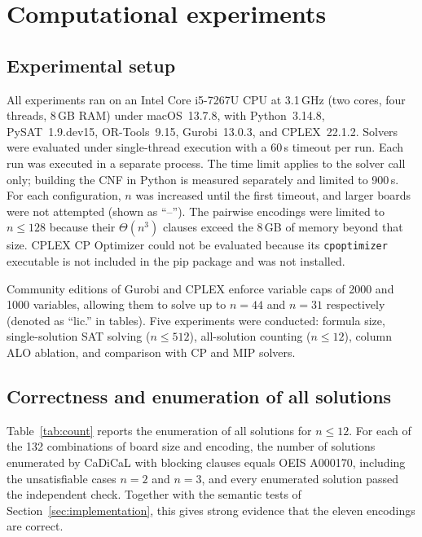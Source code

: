 \documentclass[a4paper,fleqn]{cas-sc}
\begin{document}
\FloatBarrier
\section{Computational experiments}\label{sec:experiments}

\subsection{Experimental setup}

All experiments ran on an Intel Core i5-7267U CPU at 3.1\,GHz (two cores, four threads, 8\,GB RAM) under macOS~13.7.8, with Python~3.14.8, PySAT~1.9.dev15, OR-Tools~9.15, Gurobi~13.0.3, and CPLEX~22.1.2. Solvers were evaluated under single-thread execution with a 60\,s timeout per run. Each run was executed in a separate process. The time limit applies to the solver call only; building the CNF in Python is measured separately and limited to 900\,s. For each configuration, $n$ was increased until the first timeout, and larger boards were not attempted (shown as ``--''). The pairwise encodings were limited to $n\le128$ because their $\Theta(n^3)$ clauses exceed the 8\,GB of memory beyond that size. CPLEX CP Optimizer could not be evaluated because its \texttt{cpoptimizer} executable is not included in the pip package and was not installed.

Community editions of Gurobi and CPLEX enforce variable caps of 2000 and 1000 variables, allowing them to solve up to $n=44$ and $n=31$ respectively (denoted as ``lic.'' in tables). Five experiments were conducted: formula size, single-solution SAT solving ($n\le 512$), all-solution counting ($n\le 12$), column ALO ablation, and comparison with CP and MIP solvers.

\subsection{Correctness and enumeration of all solutions}\label{sec:counting}

Table~\ref{tab:count} reports the enumeration of all solutions for $n\le12$. For each of the 132 combinations of board size and encoding, the number of solutions enumerated by CaDiCaL with blocking clauses equals OEIS A000170, including the unsatisfiable cases $n=2$ and $n=3$, and every enumerated solution passed the independent check. Together with the semantic tests of Section~\ref{sec:implementation}, this gives strong evidence that the eleven encodings are correct.
\end{document}
